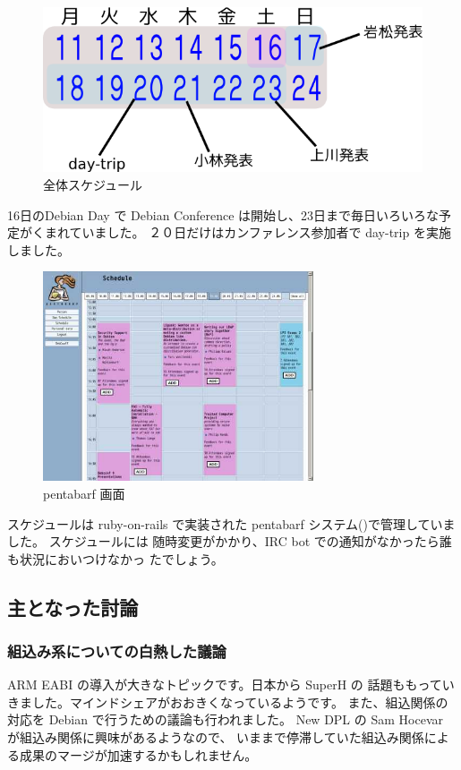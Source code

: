 \documentclass[mingoth,a4paper]{jsarticle}
\begin{document}
\begin{figure}
 \includegraphics[width=1\hsize]{image200707/schedule.png}
\caption{全体スケジュール}
\label{fig:schedule}
\end{figure}
16日のDebian Day で Debian Conference は開始し、23日まで毎日いろいろな予
定がくまれていました。
２０日だけはカンファレンス参加者で day-trip を実施しました。

\begin{figure}
\includegraphics[width=8cm]{image200707/penta.png}
\caption{pentabarf 画面}
\label{fig:penta}
\end{figure}
 スケジュールは ruby-on-rails で実装された 
pentabarf システム()で管理していました。
スケジュールには
随時変更がかかり、IRC bot での通知がなかったら誰も状況においつけなかっ
 たでしょう。


\subsection{主となった討論}

\subsubsection{組込み系についての白熱した議論}

ARM EABI の導入が大きなトピックです。日本から SuperH の
話題ももっていきました。マインドシェアがおおきくなっているようです。
また、組込関係の対応を Debian で行うための議論も行われました。
New DPL の Sam Hocevar が組込み関係に興味があるようなので、
いままで停滞していた組込み関係による成果のマージが加速するかもしれません。
\end{document}
